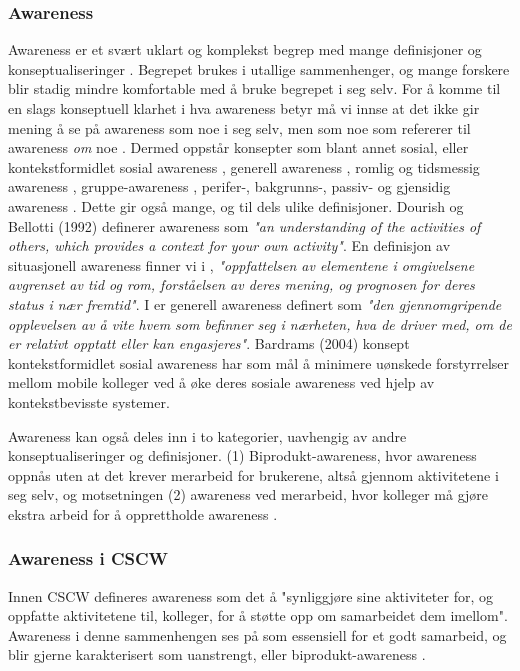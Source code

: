 \subsubsection{Awareness}
Awareness er et svært uklart og komplekst begrep med mange definisjoner og konseptualiseringer \cite{KlemetsRedundancy, Gutwin04, Schmidt02}. Begrepet brukes i utallige sammenhenger, og mange forskere blir stadig mindre komfortable med å bruke begrepet i seg selv. For å komme til en slags konseptuell klarhet i hva awareness betyr må vi innse at det ikke gir mening å se på awareness som noe i seg selv, men som noe som refererer til awareness \emph{om} noe \cite{Schmidt02}. Dermed oppstår konsepter som blant annet sosial, eller kontekstformidlet sosial awareness \cite{Bardram04}, generell awareness \cite{Gross13}, romlig og tidsmessig awareness \cite{Randell}, gruppe-awareness \cite{Gutwin04}, perifer-, bakgrunns-, passiv- og gjensidig awareness \cite{Schmidt02}. Dette gir også mange, og til dels ulike definisjoner. Dourish og Bellotti (1992) definerer awareness som \emph{"an understanding of the activities of others, which provides a context for your own activity"}. En definisjon av situasjonell awareness finner vi i \cite{Endsly95}, \emph{"oppfattelsen av elementene i omgivelsene avgrenset av tid og rom, forståelsen av deres mening, og prognosen for deres status i nær fremtid"}. I \cite{Gross13} er generell awareness definert som \emph{"den gjennomgripende opplevelsen av å vite hvem som befinner seg i nærheten, hva de driver med, om de er relativt opptatt eller kan engasjeres"}. Bardrams (2004) konsept kontekstformidlet sosial awareness har som mål å minimere uønskede forstyrrelser mellom mobile kolleger ved å øke deres sosiale awareness ved hjelp av kontekstbevisste systemer. 

\noindent
Awareness kan også deles inn i to kategorier, uavhengig av andre konseptualiseringer og definisjoner. (1) Biprodukt-awareness, hvor awareness oppnås uten at det krever merarbeid for brukerene, altså gjennom aktivitetene i seg selv, og motsetningen (2) awareness ved merarbeid, hvor kolleger må gjøre ekstra arbeid for å opprettholde awareness \cite{Randell10}. 


\subsubsection{Awareness i CSCW}
Innen CSCW defineres awareness som det å "synliggjøre sine aktiviteter for, og oppfatte aktivitetene til, kolleger, for å støtte opp om samarbeidet dem imellom". Awareness i denne sammenhengen ses på som essensiell for et godt samarbeid, og blir gjerne karakterisert som uanstrengt, eller biprodukt-awareness \cite{Randell10}. 

